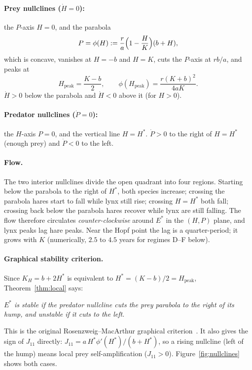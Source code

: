 \paragraph{Prey nullclines ($\dot H=0$):} the $P$-axis $H=0$, and the parabola
\begin{equation}\label{eq:prey-null}
P=\phi(H):=\frac{r}{a}\Bigl(1-\frac{H}{K}\Bigr)(b+H),
\end{equation}
which is concave, vanishes at $H=-b$ and $H=K$, cuts the $P$-axis at $rb/a$, and peaks at
\[
H_{\text{peak}}=\frac{K-b}{2},\qquad \phi(H_{\text{peak}})=\frac{r(K+b)^2}{4aK}.
\]
$\dot H>0$ below the parabola and $\dot H<0$ above it (for $H>0$).

\paragraph{Predator nullclines ($\dot P=0$):} the $H$-axis $P=0$, and the vertical line
$H=H^*$. $\dot P>0$ to the right of $H=H^*$ (enough prey) and $\dot P<0$ to the left.

\paragraph{Flow.} The two interior nullclines divide the open quadrant into four regions.
Starting below the parabola to the right of $H^*$, both species increase; crossing the parabola
hares start to fall while lynx still rise; crossing $H=H^*$ both fall; crossing back below the
parabola hares recover while lynx are still falling. The flow therefore circulates
\emph{counter-clockwise} around $E^*$ in the $(H,P)$ plane, and lynx peaks lag hare peaks.
Near the Hopf point the lag is a quarter-period; it grows with $K$ (numerically, $2.5$ to $4.5$
years for regimes D--F below).

\paragraph{Graphical stability criterion.} Since $K_H=b+2H^*$ is equivalent to
$H^*=(K-b)/2=H_{\text{peak}}$, Theorem~\ref{thm:local} says:
\begin{center}
\emph{$E^*$ is stable if the predator nullcline cuts the prey parabola to the right of its hump,
and unstable if it cuts to the left.}
\end{center}
This is the original Rosenzweig--MacArthur graphical criterion~\cite{rosenzweig1963}. It also
gives the sign of $J_{11}$ directly: $J_{11}=a\,H^*\phi'(H^*)/(b+H^*)$, so a rising nullcline
(left of the hump) means local prey self-amplification ($J_{11}>0$). Figure~\ref{fig:nullclines} shows both cases.

